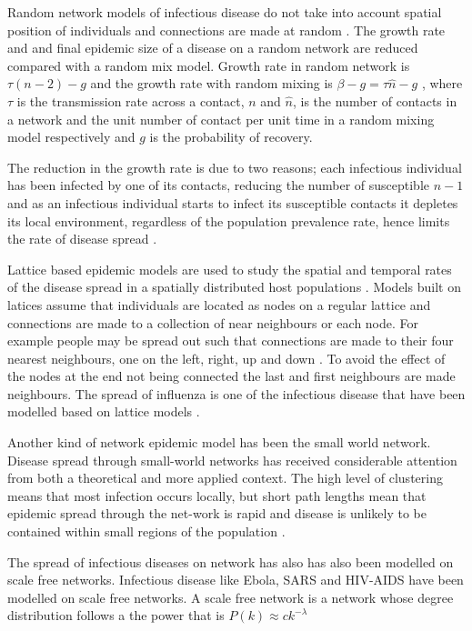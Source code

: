  Random network models of infectious disease do not take into account spatial position of individuals and connections are made at random \citep{keeling2005networks}. The growth rate and and final epidemic size of a disease on a random network are reduced compared with a random mix model. Growth rate in random network is $\tau (n -2) - g$ and the growth rate with random mixing is $\beta - g = \tau \widehat{n} -g$ , where  $\tau$ is the transmission rate across a contact, $n$ and $\widehat{n}$, is the number of contacts in a network and the unit number of contact per unit time in a random mixing model respectively and $g$ is the probability of recovery.
 
The reduction in the growth rate is due to two reasons; each infectious individual has been infected by one of its contacts, reducing the number of susceptible $n-1$ and as an infectious individual starts to infect its susceptible contacts it depletes its local environment, regardless of the population prevalence rate, hence limits the rate of disease spread \citep{keeling2005networks}.

Lattice based epidemic models are used to study the spatial and temporal rates of the disease spread in  a spatially distributed host populations \citep{rhodes1997epidemic}. Models built on latices assume that individuals are located as nodes on a regular lattice and connections are made to a collection of near neighbours or each node. For example people may be spread out such that connections are made to their four nearest neighbours, one on the left, right, up and down \citep{lloyd2006infection}. To avoid the effect of the nodes at the end not being connected the last and first neighbours are made neighbours. The spread of influenza is one of the infectious disease that have been modelled based on lattice models \citep{liccardo2013lattice}. 

Another kind of network epidemic model has been the small world network. Disease spread through small-world networks has received considerable attention from both a theoretical and more applied context. The high level of clustering means that most infection occurs locally,  but short path lengths mean that epidemic spread through the net-work is rapid and disease is unlikely to be contained within small regions of the population \citep{watts1998collective}.

The spread of infectious diseases on network has also has also been modelled on scale free networks. Infectious disease like Ebola, SARS and HIV-AIDS have been modelled on scale free networks. A scale free network is a network whose degree distribution follows a the power that is $P(k) \approx ck^{-\lambda}$  \citep{morita2016six}


